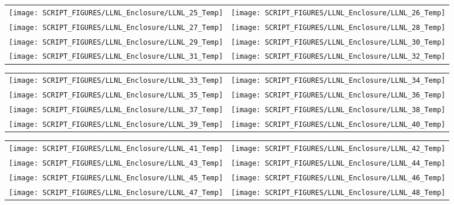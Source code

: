 \begin{figure}[p]
\begin{tabular*}{\textwidth}{l@{\extracolsep{\fill}}r}
\texttt{[image: SCRIPT\_FIGURES/LLNL\_Enclosure/LLNL\_25\_Temp]} &
\texttt{[image: SCRIPT\_FIGURES/LLNL\_Enclosure/LLNL\_26\_Temp]} \\
\texttt{[image: SCRIPT\_FIGURES/LLNL\_Enclosure/LLNL\_27\_Temp]} &
\texttt{[image: SCRIPT\_FIGURES/LLNL\_Enclosure/LLNL\_28\_Temp]} \\
\texttt{[image: SCRIPT\_FIGURES/LLNL\_Enclosure/LLNL\_29\_Temp]} &
\texttt{[image: SCRIPT\_FIGURES/LLNL\_Enclosure/LLNL\_30\_Temp]} \\
\texttt{[image: SCRIPT\_FIGURES/LLNL\_Enclosure/LLNL\_31\_Temp]} &
\texttt{[image: SCRIPT\_FIGURES/LLNL\_Enclosure/LLNL\_32\_Temp]}
\end{tabular*}
\label{LLNL_Enclosure_Temp_4}
\end{figure}

\begin{figure}[p]
\begin{tabular*}{\textwidth}{l@{\extracolsep{\fill}}r}
\texttt{[image: SCRIPT\_FIGURES/LLNL\_Enclosure/LLNL\_33\_Temp]} &
\texttt{[image: SCRIPT\_FIGURES/LLNL\_Enclosure/LLNL\_34\_Temp]} \\
\texttt{[image: SCRIPT\_FIGURES/LLNL\_Enclosure/LLNL\_35\_Temp]} &
\texttt{[image: SCRIPT\_FIGURES/LLNL\_Enclosure/LLNL\_36\_Temp]} \\
\texttt{[image: SCRIPT\_FIGURES/LLNL\_Enclosure/LLNL\_37\_Temp]} &
\texttt{[image: SCRIPT\_FIGURES/LLNL\_Enclosure/LLNL\_38\_Temp]} \\
\texttt{[image: SCRIPT\_FIGURES/LLNL\_Enclosure/LLNL\_39\_Temp]} &
\texttt{[image: SCRIPT\_FIGURES/LLNL\_Enclosure/LLNL\_40\_Temp]}
\end{tabular*}
\label{LLNL_Enclosure_Temp_5}
\end{figure}

\begin{figure}[p]
\begin{tabular*}{\textwidth}{l@{\extracolsep{\fill}}r}
\texttt{[image: SCRIPT\_FIGURES/LLNL\_Enclosure/LLNL\_41\_Temp]} &
\texttt{[image: SCRIPT\_FIGURES/LLNL\_Enclosure/LLNL\_42\_Temp]} \\
\texttt{[image: SCRIPT\_FIGURES/LLNL\_Enclosure/LLNL\_43\_Temp]} &
\texttt{[image: SCRIPT\_FIGURES/LLNL\_Enclosure/LLNL\_44\_Temp]} \\
\texttt{[image: SCRIPT\_FIGURES/LLNL\_Enclosure/LLNL\_45\_Temp]} &
\texttt{[image: SCRIPT\_FIGURES/LLNL\_Enclosure/LLNL\_46\_Temp]} \\
\texttt{[image: SCRIPT\_FIGURES/LLNL\_Enclosure/LLNL\_47\_Temp]} &
\texttt{[image: SCRIPT\_FIGURES/LLNL\_Enclosure/LLNL\_48\_Temp]}
\end{tabular*}
\label{LLNL_Enclosure_Temp_6}
\end{figure}

